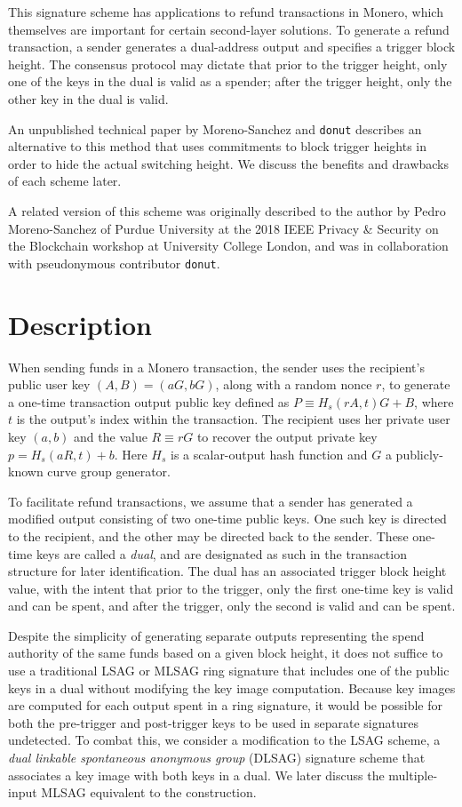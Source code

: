 \documentclass{mrl}
\begin{document}
This signature scheme has applications to refund transactions in Monero, which themselves are important for certain second-layer solutions. To generate a refund transaction, a sender generates a dual-address output and specifies a trigger block height. The consensus protocol may dictate that prior to the trigger height, only one of the keys in the dual is valid as a spender; after the trigger height, only the other key in the dual is valid.

An unpublished technical paper by Moreno-Sanchez and \texttt{donut} describes an alternative to this method that uses commitments to block trigger heights in order to hide the actual switching height. We discuss the benefits and drawbacks of each scheme later.

A related version of this scheme was originally described to the author by Pedro Moreno-Sanchez of Purdue University at the 2018 IEEE Privacy \& Security on the Blockchain workshop at University College London, and was in collaboration with pseudonymous contributor \texttt{donut}.

\section{Description}
When sending funds in a Monero transaction, the sender uses the recipient's public user key $(A,B) = (aG,bG)$, along with a random nonce $r$, to generate a one-time transaction output public key defined as $P \equiv H_s(rA,t)G + B$, where $t$ is the output's index within the transaction. The recipient uses her private user key $(a,b)$ and the value $R \equiv rG$ to recover the output private key $p = H_s(aR,t) + b$. Here $H_s$ is a scalar-output hash function and $G$ a publicly-known curve group generator.

To facilitate refund transactions, we assume that a sender has generated a modified output consisting of two one-time public keys. One such key is directed to the recipient, and the other may be directed back to the sender. These one-time keys are called a \textit{dual}, and are designated as such in the transaction structure for later identification. The dual has an associated trigger block height value, with the intent that prior to the trigger, only the first one-time key is valid and can be spent, and after the trigger, only the second is valid and can be spent.

Despite the simplicity of generating separate outputs representing the spend authority of the same funds based on a given block height, it does not suffice to use a traditional LSAG or MLSAG ring signature that includes one of the public keys in a dual without modifying the key image computation. Because key images are computed for each output spent in a ring signature, it would be possible for both the pre-trigger and post-trigger keys to be used in separate signatures undetected. To combat this, we consider a modification to the LSAG scheme, a \textit{dual linkable spontaneous anonymous group} (DLSAG) signature scheme that associates a key image with both keys in a dual. We later discuss the multiple-input MLSAG equivalent to the construction.
\end{document}
